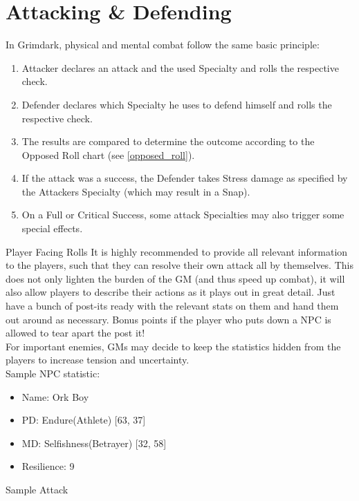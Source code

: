 \section{Attacking \& Defending}
	\label{sec:attack_defense}
	In Grimdark, physical and mental combat follow the same basic principle:
	\begin{enumerate}
		\item Attacker declares an attack and the used Specialty and rolls the respective check.
		\item Defender declares which Specialty he uses to defend himself and rolls the respective check.
		\item The results are compared to determine the outcome according to the Opposed Roll chart (see \ref{opposed_roll}).
		\item If the attack was a success, the Defender takes Stress damage as specified by the Attackers Specialty (which may result in a Snap).
		\item On a Full or Critical Success, some attack Specialties may also trigger some special effects.
	\end{enumerate}

	\begin{DndSidebar}{Player Facing Rolls}
		It is highly recommended to provide all relevant information to the players, such that they can resolve their own attack all by themselves. This does not only lighten the burden of the GM (and thus speed up combat), it will also allow players to describe their actions as it plays out in great detail. Just have a bunch of post-its ready with the relevant stats on them and hand them out around as necessary. Bonus points if the player who puts down a NPC is allowed to tear apart the post it!\\\noindent
		For important enemies, GMs may decide to keep the statistics hidden from the players to increase tension and uncertainty.\\\noindent
		Sample NPC statistic:
		\begin{itemize}
			\item Name: Ork Boy
			\item PD: Endure(Athlete) [63, 37]
			\item MD: Selfishness(Betrayer) [32, 58]
			\item Resilience: 9
		\end{itemize}
	\end{DndSidebar}

	\begin{DndSidebar}{Sample Attack}
		
	\end{DndSidebar}